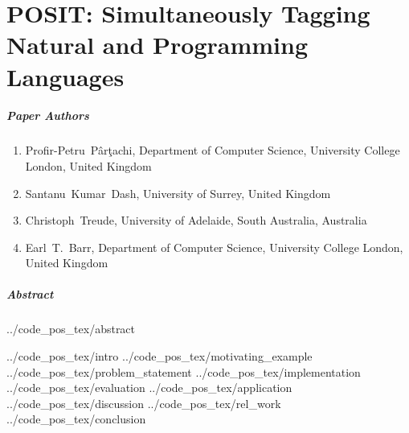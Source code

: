 \chapter{POSIT: Simultaneously Tagging Natural and Programming Languages}
\label{chapter:posit}

\renewcommand{\ourtool}{\textsc{POSIT}\xspace}
\renewcommand{\Ourtool}{\textsc{POSIT}\xspace}
\newcommand{\stormed}{StORMeD\xspace}
\newcommand{\SO}{Stack Overflow\xspace}
\newcommand{\projurl}{\url{https://github.com/PPPI/POSIT}\xspace}

\paragraph{Paper Authors}%
\begin{enumerate}
    \item[] Profir-Petru~P\^ar\c{t}achi, Department of Computer Science, University College London, United Kingdom
    \item[] Santanu~Kumar~Dash, University of Surrey, United Kingdom
    \item[] Christoph~Treude, University of Adelaide, South Australia, Australia
    \item[] Earl~T.~Barr, Department of Computer Science, University College London, United Kingdom
\end{enumerate}

\paragraph{Abstract}
{../code_pos_tex/abstract}

{../code_pos_tex/intro}
{../code_pos_tex/motivating_example}
{../code_pos_tex/problem_statement}
{../code_pos_tex/implementation}
{../code_pos_tex/evaluation}
{../code_pos_tex/application}
{../code_pos_tex/discussion}
{../code_pos_tex/rel_work}
{../code_pos_tex/conclusion}